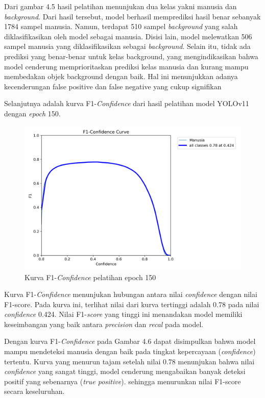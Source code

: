 Dari gambar 4.5 hasil pelatihan menunjukan dua kelas yakni manusia dan \emph{background}.
Dari hasil tersebut, model berhasil memprediksi hasil benar sebanyak 1784 sampel manusia. 
Namun, terdapat 510 sampel \emph{background} yang salah diklasifikasikan oleh model sebagai manusia. Disisi lain, model melewatkan 
506 sampel manusia yang diklasifikasikan sebagai \emph{background}. Selain itu, tidak ada prediksi yang benar-benar untuk kelas background,
yang mengindikasikan bahwa model cenderung memprioritaskan prediksi kelas manusia dan kurang mampu membedakan objek background dengan baik.
Hal ini menunjukkan adanya kecenderungan false positive dan false negative yang cukup signifikan

Selanjutnya adalah kurva F1-\emph{Confidence} dari hasil pelatihan model YOLOv11 dengan \emph{epoch} 150.
\begin{figure} [H] \centering
  \includegraphics[scale=0.25]{gambar/F1_curve-150.png}
  \caption{Kurva F1-\emph{Confidence} pelatihan epoch 150}
  \label{fig:Pengujian Performa F1-150}
\end{figure}

Kurva F1-\emph{Confidence} menunjukan hubungan antara nilai \emph{confidence} dengan nilai F1-score.
Pada kurva ini, terlihat nilai dari kurva tertinggi adalah 0.78 pada nilai \emph{confidence} 0.424. Nilai F1-\emph{score} yang tinggi ini menandakan model memiliki keseimbangan yang baik
antara \emph{precision} dan \emph{recal} pada model.

Dengan kurva F1-\emph{Confidence} pada Gambar 4.6 dapat disimpulkan bahwa model mampu mendeteksi manusia dengan baik pada tingkat kepercayaan (\emph{confidence}) tertentu.
Kurva yang menurun tajam setelah nilai 0.78 menunjukan bahwa nilai \emph{confidence} yang sangat tinggi, model cenderung mengabaikan banyak deteksi positif yang sebenarnya (\emph{true positive}).
sehingga menurunkan nilai F1-score secara keseluruhan.


